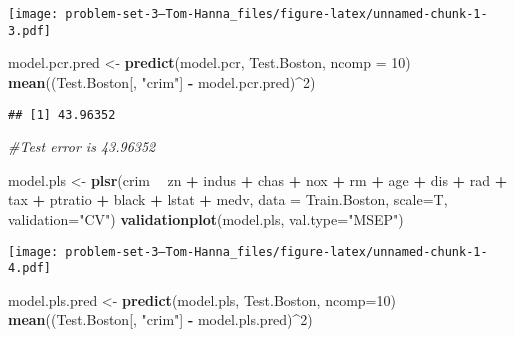 \documentclass[
]{article}
\newenvironment{Shaded}{\begin{snugshade}}{\end{snugshade}}
\newcommand{\CommentTok}[1]{\textcolor[rgb]{0.56,0.35,0.01}{\textit{#1}}}
\newcommand{\DataTypeTok}[1]{\textcolor[rgb]{0.13,0.29,0.53}{#1}}
\newcommand{\DecValTok}[1]{\textcolor[rgb]{0.00,0.00,0.81}{#1}}
\newcommand{\KeywordTok}[1]{\textcolor[rgb]{0.13,0.29,0.53}{\textbf{#1}}}
\newcommand{\NormalTok}[1]{#1}
\newcommand{\OperatorTok}[1]{\textcolor[rgb]{0.81,0.36,0.00}{\textbf{#1}}}
\newcommand{\StringTok}[1]{\textcolor[rgb]{0.31,0.60,0.02}{#1}}
\begin{document}
\texttt{[image: problem-set-3---Tom-Hanna\_files/figure-latex/unnamed-chunk-1-3.pdf]}

\begin{Shaded}
\begin{Highlighting}[]
\NormalTok{model.pcr.pred <-}\StringTok{ }\KeywordTok{predict}\NormalTok{(model.pcr, Test.Boston, }\DataTypeTok{ncomp =} \DecValTok{10}\NormalTok{)}
\KeywordTok{mean}\NormalTok{((Test.Boston[, }\StringTok{"crim"}\NormalTok{] }\OperatorTok{-}\StringTok{ }\NormalTok{model.pcr.pred)}\OperatorTok{^}\DecValTok{2}\NormalTok{)}
\end{Highlighting}
\end{Shaded}

\begin{verbatim}
## [1] 43.96352
\end{verbatim}

\begin{Shaded}
\begin{Highlighting}[]
\CommentTok{#Test error is 43.96352}

\NormalTok{model.pls <-}\StringTok{ }\KeywordTok{plsr}\NormalTok{(crim }\OperatorTok{~}\StringTok{ }\NormalTok{zn }\OperatorTok{+}\StringTok{ }\NormalTok{indus }\OperatorTok{+}\StringTok{ }\NormalTok{chas }\OperatorTok{+}\StringTok{ }\NormalTok{nox }\OperatorTok{+}\StringTok{ }\NormalTok{rm }\OperatorTok{+}\StringTok{ }\NormalTok{age }\OperatorTok{+}\StringTok{ }\NormalTok{dis }\OperatorTok{+}\StringTok{ }\NormalTok{rad }\OperatorTok{+}\StringTok{ }\NormalTok{tax }\OperatorTok{+}\StringTok{ }\NormalTok{ptratio }\OperatorTok{+}\StringTok{ }\NormalTok{black }\OperatorTok{+}\StringTok{ }\NormalTok{lstat }\OperatorTok{+}\StringTok{ }\NormalTok{medv, }\DataTypeTok{data =}\NormalTok{ Train.Boston, }\DataTypeTok{scale=}\NormalTok{T, }\DataTypeTok{validation=}\StringTok{"CV"}\NormalTok{)}
\KeywordTok{validationplot}\NormalTok{(model.pls, }\DataTypeTok{val.type=}\StringTok{"MSEP"}\NormalTok{)}
\end{Highlighting}
\end{Shaded}

\texttt{[image: problem-set-3---Tom-Hanna\_files/figure-latex/unnamed-chunk-1-4.pdf]}

\begin{Shaded}
\begin{Highlighting}[]
\NormalTok{model.pls.pred <-}\StringTok{ }\KeywordTok{predict}\NormalTok{(model.pls, Test.Boston, }\DataTypeTok{ncomp=}\DecValTok{10}\NormalTok{)}
\KeywordTok{mean}\NormalTok{((Test.Boston[, }\StringTok{"crim"}\NormalTok{] }\OperatorTok{-}\StringTok{ }\NormalTok{model.pls.pred)}\OperatorTok{^}\DecValTok{2}\NormalTok{)}
\end{Highlighting}
\end{Shaded}
\end{document}
